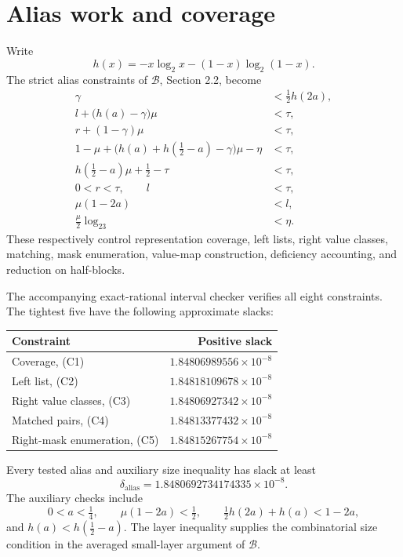 \documentclass[11pt,a4paper]{article}
\theoremstyle{remark}
\newcommand{\Base}{\ensuremath{\mathcal{B}}}
\newcommand{\logtwo}{\log_2}
\begin{document}
\section{Alias work and coverage}
\label{sec:alias}

Write
\[
 h(x)=-x\logtwo x-(1-x)\logtwo(1-x).
\]
The strict alias constraints of \Base, Section 2.2, become
\begin{align}
 \gamma &< \tfrac12 h(2a), \tag{C1}\label{c1}\\
 l+\bigl(h(a)-\gamma\bigr)\mu &<\tau, \tag{C2}\label{c2}\\
 r+(1-\gamma)\mu &<\tau, \tag{C3}\label{c3}\\
 1-\mu+\bigl(h(a)+h(\tfrac12-a)-\gamma\bigr)\mu-\eta
 &<\tau, \tag{C4}\label{c4}\\
 h(\tfrac12-a)\mu+\tfrac12-\tau &<\tau, \tag{C5}\label{c5}\\
 0<r<\tau,\qquad l&<\tau, \tag{C6}\label{c6}\\
 \mu(1-2a)&<l, \tag{C7}\label{c7}\\
 \tfrac{\mu}{2}\logtwo3&<\eta. \tag{C8}\label{c8}
\end{align}
These respectively control representation coverage, left lists, right
value classes, matching, mask enumeration, value-map construction,
deficiency accounting, and reduction on half-blocks.

The accompanying exact-rational interval checker verifies all eight
constraints. The tightest five have the following approximate slacks:
\begin{center}
\begin{tabular}{@{}lr@{}}
\toprule
Constraint & Positive slack\\
\midrule
Coverage, (C1) & $1.84806989556\times10^{-8}$\\
Left list, (C2) & $1.84818109678\times10^{-8}$\\
Right value classes, (C3) & $1.84806927342\times10^{-8}$\\
Matched pairs, (C4) & $1.84813377432\times10^{-8}$\\
Right-mask enumeration, (C5) & $1.84815267754\times10^{-8}$\\
\bottomrule
\end{tabular}
\end{center}
Every tested alias and auxiliary size inequality has slack at least
\begin{equation}
\label{eq:alias-slack}
 \delta_{\mathrm{alias}}=1.8480692734174335\times10^{-8}.
\end{equation}
The auxiliary checks include
\begin{equation}
\label{eq:aux}
 0<a<\tfrac14,\qquad
 \mu(1-2a)<\tfrac12,\qquad
 \tfrac12h(2a)+h(a)<1-2a,
\end{equation}
and $h(a)<h(\tfrac12-a)$. The layer inequality supplies the combinatorial
size condition in the averaged small-layer argument of \Base.
\end{document}
